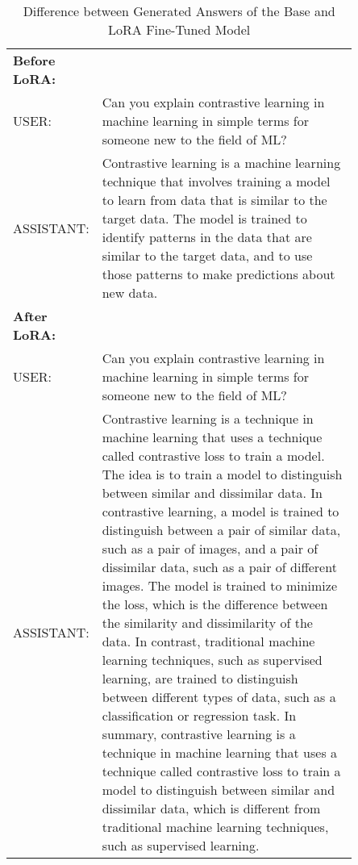 \begin{table}[h!]
	\caption{Difference between Generated Answers of the Base and LoRA Fine-Tuned Model} \vspace{0.25em}
	\centering
	\renewcommand{\arraystretch}{1.2} %
	\begin{tabular}{@{}lp{0.85\linewidth}@{}}
		\hline
		\textbf{Before LoRA:} & \\
		USER: & Can you explain contrastive learning in machine learning in simple terms for someone new to the field of ML? \\
		ASSISTANT: & Contrastive learning is a machine learning technique that involves training a model to learn from data that is similar to the target data. The model is trained to identify patterns in the data that are similar to the target data, and to use those patterns to make predictions about new data. \\
		\hline
		\textbf{After LoRA:} & \\
		USER: & Can you explain contrastive learning in machine learning in simple terms for someone new to the field of ML? \\
		ASSISTANT: & Contrastive learning is a technique in machine learning that uses a technique called contrastive loss to train a model. The idea is to train a model to distinguish between similar and dissimilar data. In contrastive learning, a model is trained to distinguish between a pair of similar data, such as a pair of images, and a pair of dissimilar data, such as a pair of different images. The model is trained to minimize the loss, which is the difference between the similarity and dissimilarity of the data. In contrast, traditional machine learning techniques, such as supervised learning, are trained to distinguish between different types of data, such as a classification or regression task. In summary, contrastive learning is a technique in machine learning that uses a technique called contrastive loss to train a model to distinguish between similar and dissimilar data, which is different from traditional machine learning techniques, such as supervised learning. \\
		\hline
	\end{tabular}
\end{table}
